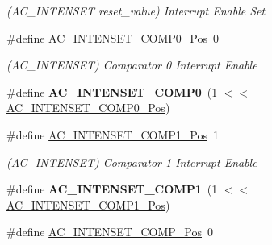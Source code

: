 \begin{DoxyCompactItemize}
\begin{DoxyCompactList}\small\item\em (A\+C\+\_\+\+I\+N\+T\+E\+N\+S\+E\+T reset\+\_\+value) Interrupt Enable Set \end{DoxyCompactList}\item 
\hypertarget{group___s_a_m_l21___a_c_ga165b37facbcb1af2c424f505995a98c5}{}\#define \hyperlink{group___s_a_m_l21___a_c_ga165b37facbcb1af2c424f505995a98c5}{A\+C\+\_\+\+I\+N\+T\+E\+N\+S\+E\+T\+\_\+\+C\+O\+M\+P0\+\_\+\+Pos}~0\label{group___s_a_m_l21___a_c_ga165b37facbcb1af2c424f505995a98c5}

\begin{DoxyCompactList}\small\item\em (A\+C\+\_\+\+I\+N\+T\+E\+N\+S\+E\+T) Comparator 0 Interrupt Enable \end{DoxyCompactList}\item 
\hypertarget{group___s_a_m_l21___a_c_gab9ea518c5bf3382e8b82c654620b8633}{}\#define {\bfseries A\+C\+\_\+\+I\+N\+T\+E\+N\+S\+E\+T\+\_\+\+C\+O\+M\+P0}~(1 $<$$<$ \hyperlink{group___s_a_m_l21___a_c_ga165b37facbcb1af2c424f505995a98c5}{A\+C\+\_\+\+I\+N\+T\+E\+N\+S\+E\+T\+\_\+\+C\+O\+M\+P0\+\_\+\+Pos})\label{group___s_a_m_l21___a_c_gab9ea518c5bf3382e8b82c654620b8633}

\item 
\hypertarget{group___s_a_m_l21___a_c_gaffb9e6ec2b081b05fe380f0a8bc71b03}{}\#define \hyperlink{group___s_a_m_l21___a_c_gaffb9e6ec2b081b05fe380f0a8bc71b03}{A\+C\+\_\+\+I\+N\+T\+E\+N\+S\+E\+T\+\_\+\+C\+O\+M\+P1\+\_\+\+Pos}~1\label{group___s_a_m_l21___a_c_gaffb9e6ec2b081b05fe380f0a8bc71b03}

\begin{DoxyCompactList}\small\item\em (A\+C\+\_\+\+I\+N\+T\+E\+N\+S\+E\+T) Comparator 1 Interrupt Enable \end{DoxyCompactList}\item 
\hypertarget{group___s_a_m_l21___a_c_gaa2c586a1c14a0d764b16be1e57ddf6f8}{}\#define {\bfseries A\+C\+\_\+\+I\+N\+T\+E\+N\+S\+E\+T\+\_\+\+C\+O\+M\+P1}~(1 $<$$<$ \hyperlink{group___s_a_m_l21___a_c_gaffb9e6ec2b081b05fe380f0a8bc71b03}{A\+C\+\_\+\+I\+N\+T\+E\+N\+S\+E\+T\+\_\+\+C\+O\+M\+P1\+\_\+\+Pos})\label{group___s_a_m_l21___a_c_gaa2c586a1c14a0d764b16be1e57ddf6f8}

\item 
\hypertarget{group___s_a_m_l21___a_c_ga2b61c7a2be4d8dac26ce19d694a91b60}{}\#define \hyperlink{group___s_a_m_l21___a_c_ga2b61c7a2be4d8dac26ce19d694a91b60}{A\+C\+\_\+\+I\+N\+T\+E\+N\+S\+E\+T\+\_\+\+C\+O\+M\+P\+\_\+\+Pos}~0\label{group___s_a_m_l21___a_c_ga2b61c7a2be4d8dac26ce19d694a91b60}


\end{DoxyCompactItemize}

